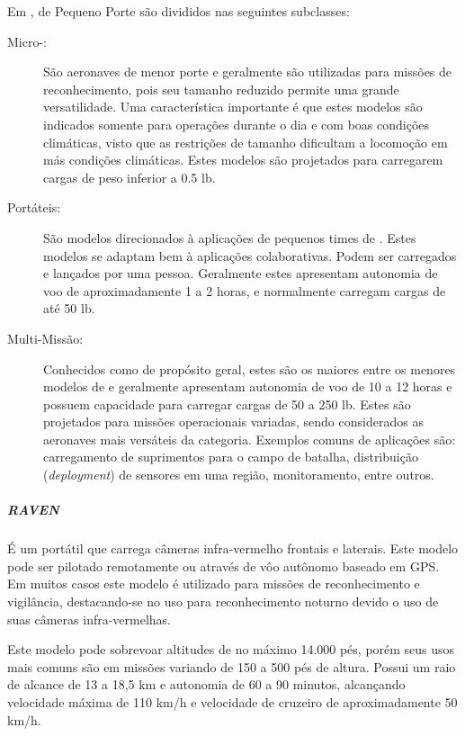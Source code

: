 Em \cite{Drew2005}, \vants de Pequeno Porte são divididos nas seguintes subclasses:

\begin{description}

\item[Micro-\vants: ]
São aeronaves de menor porte e geralmente são utilizadas para missões de reconhecimento, pois seu tamanho reduzido permite uma
grande versatilidade. Uma característica importante é que estes modelos são indicados somente para operações durante o dia e com
boas condições climáticas, visto que as restrições de tamanho dificultam a locomoção em más condições climáticas. Estes modelos são projetados para carregarem cargas de peso inferior a 0.5 lb.

\item[Portáteis: ]
São modelos direcionados à aplicações de pequenos times de \vants. Estes modelos se adaptam bem à aplicações colaborativas. Podem ser carregados e lançados por uma pessoa. Geralmente estes \vants apresentam autonomia de voo de aproximadamente 1 a 2 horas, e normalmente carregam cargas de até 50 lb.

\item[Multi-Missão: ]
Conhecidos como \vants  de propósito geral, estes são os maiores entre os menores modelos de \vants e geralmente apresentam autonomia de voo de 10 a 12 horas e possuem capacidade para carregar cargas de 50 a 250 lb. Estes \vants são projetados para missões operacionais variadas, sendo considerados as aeronaves mais versáteis da categoria. Exemplos comuns de aplicações são: carregamento de suprimentos para o campo de batalha, distribuição (\emph{deployment}) de sensores em uma região, monitoramento, entre outros.

\end{description}


\subparagraph{\emph{RAVEN}}
É um \vant portátil que carrega câmeras infra-vermelho frontais e laterais. Este modelo pode ser pilotado remotamente ou através de vôo autônomo baseado em GPS. Em muitos casos 
este modelo é utilizado para missões de reconhecimento e vigilância, destacando-se no uso para reconhecimento noturno devido o uso de suas câmeras infra-vermelhas.

Este modelo pode sobrevoar altitudes de no máximo 14.000 pés, porém seus usos mais comuns são em missões variando de 150 a 500 pés de altura. Possui um raio de alcance de 
13 a 18,5 km e autonomia de 60 a 90 minutos, alcançando velocidade máxima de 110 km/h e velocidade de cruzeiro de aproximadamente 50 km/h. \cite{uas_2009}

